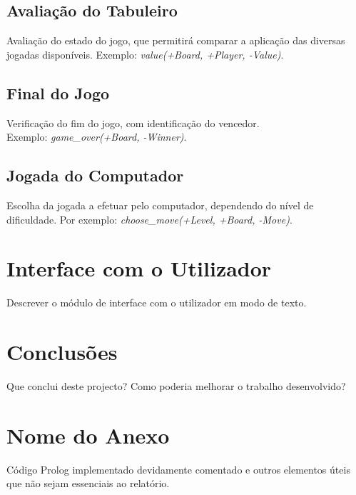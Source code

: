 \documentclass[a4paper]{article}
\begin{document}
\subsection{Avaliação do Tabuleiro} Avaliação do estado do jogo, que permitirá comparar a aplicação das diversas jogadas disponíveis. Exemplo: \textit{value(+Board, +Player, -Value)}.

\subsection{Final do Jogo} Verificação do fim do jogo, com identificação do vencedor. \\Exemplo: \textit{game\_over(+Board, -Winner)}.

\subsection{Jogada do Computador} Escolha da jogada a efetuar pelo computador, dependendo do nível de dificuldade. Por exemplo: \textit{choose\_move(+Level, +Board, -Move)}.


\section{Interface com o Utilizador}

Descrever o módulo de interface com o utilizador em modo de texto.


\section{Conclusões}
Que conclui deste projecto? Como poderia melhorar o trabalho desenvolvido?


\clearpage
%
%

\newpage
\appendix
\section{Nome do Anexo}
Código Prolog implementado devidamente comentado e outros elementos úteis que não sejam essenciais ao relatório.
\end{document}
